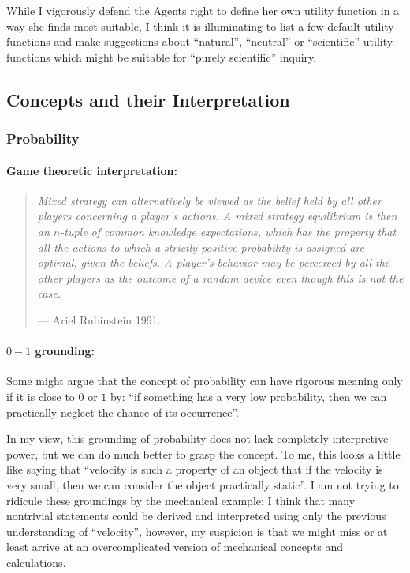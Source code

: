 \documentclass{article}
\begin{document}
While I vigorously defend the Agents right to define her own utility function in a way she finds most suitable, I think it is illuminating to list a few default utility functions and make suggestions about ``natural'', ``neutral'' or ``scientific'' utility functions which might be suitable for ``purely scientific'' inquiry.

\subsection*{Concepts and their Interpretation}

\subsubsection*{Probability}

\paragraph{Game theoretic interpretation:}

    \begin{quote}
    {\it
    Mixed strategy can alternatively be viewed as the belief held by all other players concerning a player's actions. A mixed strategy equilibrium is then an $n$-tuple of common knowledge expectations, which has the property that all the actions to which a strictly positive probability is assigned are optimal, given the beliefs. A player's behavior may be perceived by all the other players as the outcome of a random device even though this is not the case.
    }
    
    \hfill --- Ariel Rubinstein 1991.
    \end{quote}

\paragraph{$0-1$ grounding:}
Some might argue that the concept of probability can have rigorous meaning only if it is close to $0$ or $1$ by: ``if something has a very low probability, then we can practically neglect the chance of its occurrence''.

In my view, this grounding of probability does not lack completely interpretive power, but we can do much better to grasp the concept. To me, this looks a little like saying that ``velocity is such a property of an object that if the velocity is very small, then we can consider the object practically static''. I am not trying to ridicule these groundings by the mechanical example; I think that many nontrivial statements could be derived and interpreted using only the previous understanding of ``velocity'', however, my suspicion is that we might miss or at least arrive at an overcomplicated version of mechanical concepts and calculations.
\end{document}
